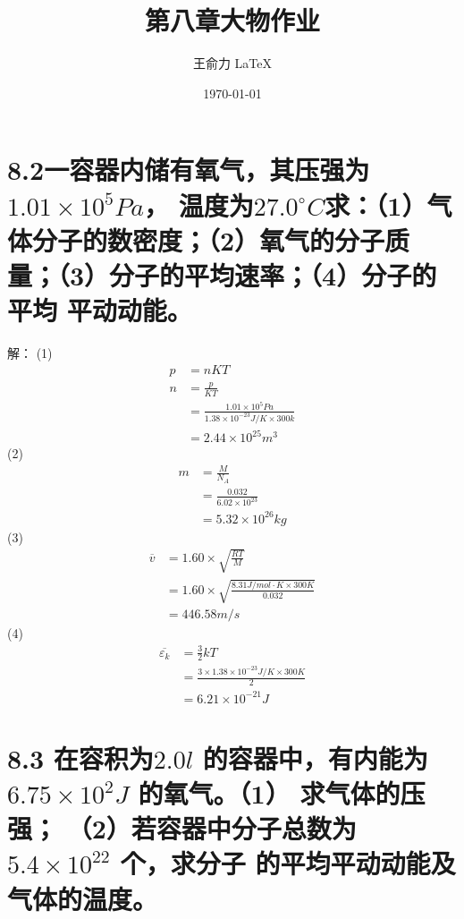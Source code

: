 \documentclass[lang=cn]{elegantpaper}
\title{第八章大物作业}
\author{王俞力 \LaTeX}
\institute{学号：2010400736}
\date{\today}
\begin{document}
\maketitle

\section{8.2一容器内储有氧气，其压强为\(1.01\times 10^5Pa\)，
温度为\(27.0^{\circ}C\)求：（1）气体分子的数密度；（2）氧气的分子质量；（3）分子的平均速率；（4）分子的平均 平动动能。}

解：
(1)\[
  \begin{align}
    p &= nKT\\
    n &= \frac{p}{KT} \\
    &= \frac{1.01 \times 10^5 Pa}{1.38 \times 10^{-23} J / K \times 300k} \\
    &= 2.44 \times 10^{25} m^{3}
  \end{align}
    \]
(2)
\[
  \begin{align}
    m &= \frac{M}{N_A}\\
    &= \frac{0.032}{6.02 \times 10^{23}} \\
    &= 5.32 \times 10^{26} kg
  \end{align}
\]
(3)
\[
  \begin{align}
  \overline{v} &= 1.60 \times \sqrt{\frac{RT}{M}}\\
  &= 1.60 \times \sqrt{\frac{8.31J/mol \cdot K \times 300K}{0.032}}\\
  &= 446.58m/s
\end{align}
\]
(4)
\[
  \begin{align}
  \overline{\varepsilon _k} &= \frac{3}{2}kT\\
  &= \frac{3 \times 1.38 \times 10^{-23} J/K\times 300K}{2}\\
  &= 6.21 \times 10^{-21}J
  \end{align}
\]
\section{8.3
在容积为\(2.0l\)
的容器中，有内能为\(6.75\times10^2J\)
的氧气。（1）
求气体的压强； （2）若容器中分子总数为\(5.4 \times 10^{22}\)
个，求分子
的平均平动动能及气体的温度。
}
\end{document}
